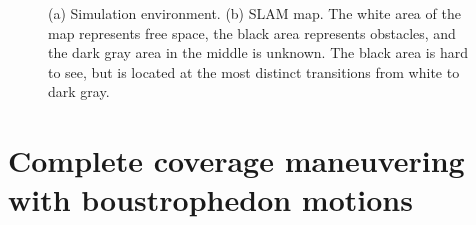 \begin{figure}[h!]
    \centering
	\caption[Map generation with SLAM of a simulated environment.]{(a) Simulation environment. (b) SLAM map. The white area of the map represents free space, the black area represents obstacles, and the dark gray area in the middle is unknown. The black area is hard to see, but is located at the most distinct transitions from white to dark gray.}
	\label{fig:sim_sensor_fusion}
\end{figure} 

\section{Complete coverage maneuvering with boustrophedon motions}

